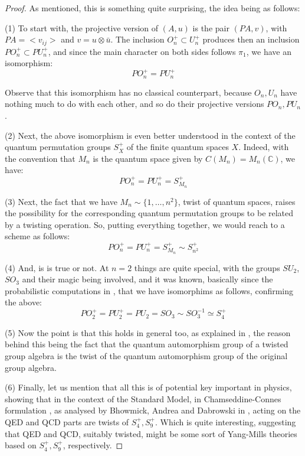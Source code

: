 \documentclass[12pt]{amsbook}
\begin{document}
\begin{proof}
As mentioned, this is something quite surprising, the idea being as follows:

\medskip

(1) To start with, the projective version of $(A,u)$ is the pair $(PA,v)$, with $PA=<v_{ij}>$ and $v=u\otimes\bar{u}$. The inclusion $O_n^+\subset U_n^+$ produces then an inclusion $PO_n^+\subset PU_n^+$, and since the main character on both sides follows $\pi_1$, we have an isomorphism:
$$PO_n^+=PU_n^+$$

Observe that this isomorphism has no classical counterpart, because $O_n,U_n$ have nothing much to do with each other, and so do their projective versions $PO_n,PU_n$.

\medskip

(2) Next, the above isomorphism is even better understood in the context of the quantum permutation groups $S_X^+$ of the finite quantum spaces $X$. Indeed, with the convention that $M_n$ is the quantum space given by $C(M_n)=M_n(\mathbb C)$, we have:
$$PO_n^+=PU_n^+=S_{M_n}^+$$

(3) Next, the fact that we have $M_n\sim\{1,\ldots,n^2\}$, twist of quantum spaces, raises the possibility for the corresponding quantum permutation groups to be related by a twisting operation. So, putting everything together, we would reach to a scheme as follows:
$$PO_n^+=PU_n^+=S_{M_n}^+\sim S_{n^2}^+$$ 

(4) And, is is true or not. At $n=2$ things are quite special, with the groups $SU_2$, $SO_3$ and their magic being involved, and it was known, basically since the probabilistic computations in \cite{bco}, that we have isomorphims as follows, confirming the above:
$$PO_2^+=PU_2^+=PU_2=SO_3\sim SO_3^{-1}\simeq S_4^+$$

(5) Now the point is that this holds in general too, as explained in \cite{bbc}, the reason behind this being the fact that the quantum automorphism group of a twisted group algebra is the twist of the quantum automorphism group of the original group algebra.

\medskip

(6) Finally, let us mention that all this is of potential key important in physics, showing that in the context of the Standard Model, in Chamseddine-Connes formulation \cite{cco}, as analysed by Bhowmick, Andrea and Dabrowski in \cite{bdd}, acting on the QED and QCD parts are twists of $S_4^+,S_9^+$. Which is quite interesting, suggesting that QED and QCD, suitably twisted, might be some sort of Yang-Mills theories based on $S_4^+,S_9^+$, respectively.
\end{proof}
\end{document}
